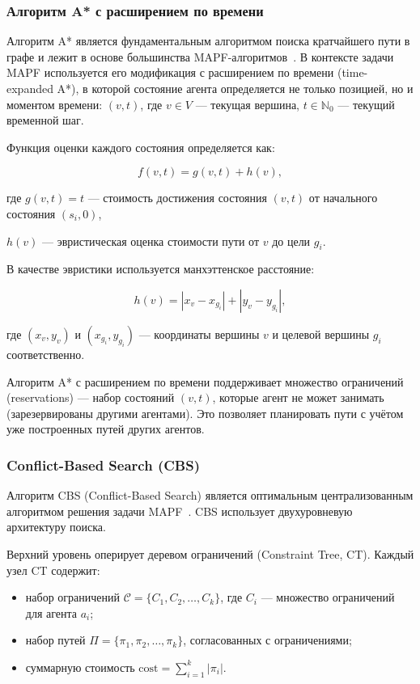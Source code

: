 \subsubsection{Алгоритм A* с расширением по времени}

Алгоритм A* является фундаментальным алгоритмом поиска кратчайшего пути в графе и лежит в основе большинства MAPF-алгоритмов~\cite{hart1968astar}. В контексте задачи MAPF используется его модификация с расширением по времени (time-expanded A*), в которой состояние агента определяется не только позицией, но и моментом времени: $(v, t)$, где $v \in V$ --- текущая вершина, $t \in \mathbb{N}_0$ --- текущий временной шаг.

Функция оценки каждого состояния определяется как:

\begin{equation}
    \label{eq:astar}
    f(v, t) = g(v, t) + h(v),
\end{equation}

где $g(v, t) = t$ --- стоимость достижения состояния $(v, t)$ от начального состояния $(s_i, 0)$,\par $h(v)$ --- эвристическая оценка стоимости пути от $v$ до цели $g_i$.

В качестве эвристики используется манхэттенское расстояние:

\begin{equation}
    \label{eq:manhattan}
    h(v) = |x_v - x_{g_i}| + |y_v - y_{g_i}|,
\end{equation}

где $(x_v, y_v)$ и $(x_{g_i}, y_{g_i})$ --- координаты вершины $v$ и целевой вершины $g_i$ соответственно.

Алгоритм A* с расширением по времени поддерживает множество ограничений (reservations) --- набор состояний $(v, t)$, которые агент не может занимать (зарезервированы другими агентами). Это позволяет планировать пути с учётом уже построенных путей других агентов.

\subsubsection{Conflict-Based Search (CBS)}

Алгоритм CBS (Conflict-Based Search) является оптимальным централизованным алгоритмом решения задачи MAPF~\cite{sharon2015cbs}. CBS использует двухуровневую архитектуру поиска.

Верхний уровень оперирует деревом ограничений (Constraint Tree, CT). Каждый узел CT содержит:
\begin{itemize}
    \item набор ограничений $\mathcal{C} = \{C_1, C_2, \ldots, C_k\}$, где $C_i$ --- множество ограничений для агента $a_i$;
    \item набор путей $\Pi = \{\pi_1, \pi_2, \ldots, \pi_k\}$, согласованных с ограничениями;
    \item суммарную стоимость $\text{cost} = \sum_{i=1}^{k} |\pi_i|$.
\end{itemize}

